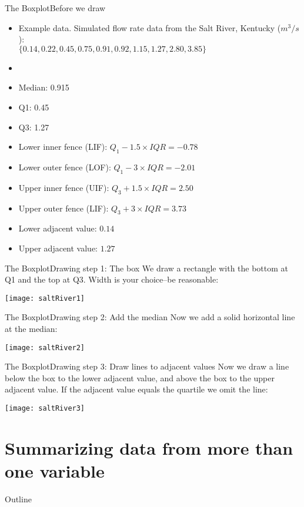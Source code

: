 \documentclass[xcolor=dvipsnames]{beamer}
\begin{document}
\begin{frame}{The Boxplot}{Before we draw}
	\begin{itemize}
		\item Example data. Simulated flow rate data from the Salt River, Kentucky ($m^3 / s$): \\
		$\{0.14, 0.22, 0.45, 0.75, 0.91, 0.92, 1.15, 1.27, 2.80, 3.85\}$
		\item[]
		\item Median: 0.915
		\item Q1: 0.45
		\item Q3: 1.27
		\item Lower inner fence (LIF): $Q_1 - 1.5 \times IQR = -0.78 $
		\item Lower outer fence (LOF): $Q_1 - 3 \times IQR = -2.01$
		\item Upper inner fence (UIF): $Q_3 + 1.5 \times IQR = 2.50 $
		\item Upper outer fence (LIF): $Q_3 + 3 \times IQR = 3.73 $
		\item Lower adjacent value: $0.14$
		\item Upper adjacent value: $1.27$
	\end{itemize}
\end{frame}

\begin{frame}{The Boxplot}{Drawing step 1: The box}
	We draw a rectangle with the bottom at Q1 and the top at Q3. Width is your choice--be reasonable:
	\begin{center}
		\texttt{[image: saltRiver1]}
	\end{center}
\end{frame}

\begin{frame}{The Boxplot}{Drawing step 2: Add the median}
	Now we add a solid horizontal line at the median:
	\begin{center}
		\texttt{[image: saltRiver2]}
	\end{center}
\end{frame}

\begin{frame}{The Boxplot}{Drawing step 3: Draw lines to adjacent values}
	Now we draw a line below the box to the lower adjacent value, and above the box to the upper adjacent value. If the adjacent value equals the quartile we omit the line:
	\begin{center}
		\texttt{[image: saltRiver3]}
	\end{center}
\end{frame}


\section{Summarizing data from more than one variable }
\begin{frame}{Outline}
	\tableofcontents[currentsection,subsectionstyle=show/shaded/hide]
\end{frame}
\end{document}
